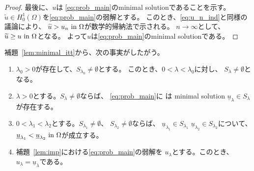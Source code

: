 \begin{proof}
 最後に、$u$は
 \ref{eq:prob_main}のminimal solutionであることを示す。
 $\tilde{u} \in H_0^1(\Omega)$を\ref{eq:prob_main}の弱解とする。
 このとき、\eqref{eq:u_n_ind}と同様の議論により、
 $\widetilde{u} > u_n ~\text{in}~ \Omega$が数学的帰納法で示される。
 $n \to \infty$として、$\widetilde{u} \geq u ~\text{in}~ \Omega$となる。
 よって$u$は\ref{eq:prob_main}のminimal solutionである。\qedhere
\end{proof}

補題~\ref{lem:minimal_itt}から、次の事実がしたがう。

\begin{lem} \label{lem:minimal_va}
 \begin{enumerate}[1.] \sage
  \item $\lambda_0 > 0$が存在して、$S_{\lambda_0} \neq \emptyset$とする。
        このとき、$0 < \lambda < \lambda_0$に対し、
        $S_\lambda \neq \emptyset$となる。
  \item $\lambda > 0$とする。$S_\lambda \neq \emptyset$ならば、
        \ref{eq:prob_main}に
        は minimal solution $\underline{u}_\lambda
        \in S_\lambda$が存在する。
  \item $0 < \lambda_1 < \lambda_2$とする。$S_{\lambda_1} \neq
        \emptyset$、
        $S_{\lambda_2} \neq \emptyset$ならば、
        $\underline{u}_{\lambda_1} \in S_{\lambda_1}$
        $\underline{u}_{\lambda_2} \in S_{\lambda_2}$について、
        $\underline{u}_{\lambda_1} < \underline{u}_{\lambda_2} ~\text{in}~
        \Omega$が成立する。
  \item 補題~\ref{lem:imp}における\ref{eq:prob_main}の弱解を
        $u_\lambda$とする。このとき、$u_\lambda =
        \underline{u}_\lambda$である。
 \end{enumerate}
\end{lem}

